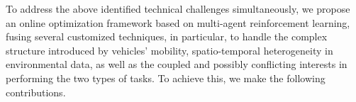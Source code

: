

To address the above identified technical challenges simultaneously, we propose an online optimization framework based on multi-agent reinforcement learning, fusing several customized techniques, in particular, to handle the complex structure introduced by vehicles' mobility, spatio-temporal heterogeneity in environmental data, as well as the coupled and possibly conflicting interests in performing the two types of tasks. 
To achieve this, we make the following contributions.

